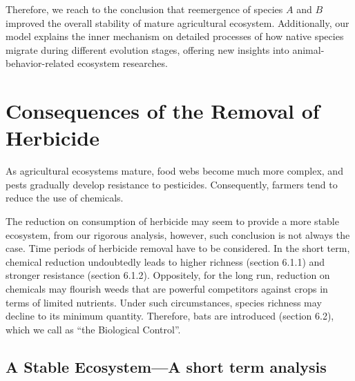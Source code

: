 \documentclass[12pt]{article}
\begin{document}
	Therefore, we reach to the conclusion that reemergence of species $A$ and $B$ improved the overall stability of mature agricultural ecosystem. Additionally, our model explains the inner mechanism on detailed processes of how native species migrate during different evolution stages, offering new insights into animal-behavior-related ecosystem researches.
	
	\section{Consequences of the Removal of Herbicide}
	\hspace{1.5em}As agricultural ecosystems mature, food webs become much more complex, and pests gradually develop resistance to pesticides. Consequently, farmers tend to reduce the use of chemicals. 
	
	The reduction on consumption of herbicide may seem to provide a more stable ecosystem, from our rigorous analysis, however, such conclusion is not always the case. Time periods of herbicide removal have to be considered. In the short term, chemical reduction undoubtedly leads to higher richness (section 6.1.1) and stronger resistance (section 6.1.2). Oppositely, for the long run, reduction on chemicals may flourish weeds that are powerful competitors against crops in terms of limited nutrients. Under such circumstances, species richness may decline to its minimum quantity. Therefore, bats are introduced (section 6.2), which we call as ``the Biological Control''.
	\subsection{A Stable Ecosystem---A short term analysis}
\end{document}
